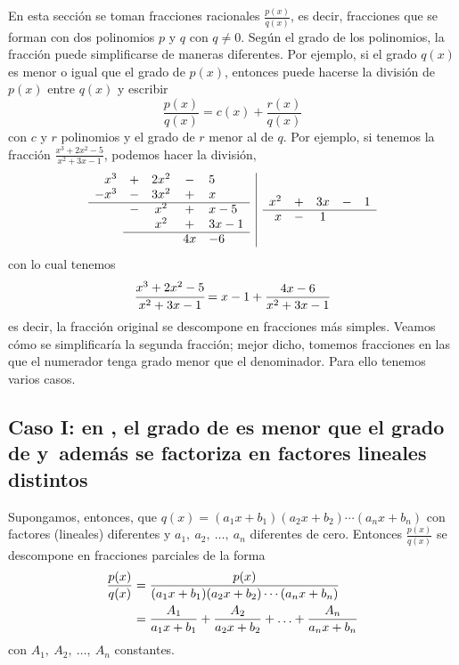 En esta sección se toman fracciones racionales $\frac{p(x)}{q(x)}$, es decir, fracciones que se forman con dos polinomios $p$ y $q$ con $q\ne0$. Según el grado de los polinomios, la fracción puede simplificarse de maneras diferentes. Por ejemplo, si el grado $q(x)$ es menor o igual que el grado de $p(x)$, entonces puede hacerse la división de $p(x)$ entre $q(x)$ y escribir
\[
  \frac{p(x)}{q(x)}=c(x)+\frac{r(x)}{q(x)}
\]
con $c$ y $r$ polinomios y el grado de $r$ menor al de $q$. Por ejemplo, si tenemos la fracción $\frac{x^3+2x^2-5}{x^2+3x-1}$, podemos hacer la división,
\[
  \begin{array}{c|c} %
    \begin{array}{rcccl} %
      x^3 & + & 2x^2 & - & 5 \\
      -x^3 & - & 3x^2 & + & x \\
      \cline{1-5}
      & - & x^2 & + & x-5 \\
      & & x^2 & + & 3x-1 \\
      \cline{2-5}
      & & & 4x & -6 \\
    \end{array}
    &
    \begin{array}{rcccl} %
      x^2 & + & 3x & - & 1 \\
      \cline{1-5}
      x & - & 1 & &
    \end{array}
  \end{array}
\]
con lo cual tenemos
\[
  \cfrac{x^3+2x^2-5}{x^2+3x-1}=x-1+\frac{4x-6}{x^2+3x-1}
\]
es decir, la fracción original se descompone en fracciones más simples. Veamos cómo se simplificaría la segunda fracción; mejor dicho, tomemos fracciones en las que el numerador tenga grado menor que el denominador. Para ello tenemos varios casos.

\subsection{Caso I: en \texorpdfstring{}{p(x)/q(x)}, el grado de \texorpdfstring{}{p} es menor que el grado de \texorpdfstring{}{q} y~además \texorpdfstring{}{q} se factoriza en factores lineales distintos}

Supongamos, entonces, que $q(x)=(a_1x+b_1)(a_2x+b_2)\cdots(a_nx+b_n)$ con factores (lineales) diferentes y $a_1,\ a_2,\ \ldots,\ a_n$ diferentes de cero. Entonces $\frac{p(x)}{q(x)}$ se descompone en fracciones parciales de la forma
\begin{align}\label{FraccLinDif}
  \frac{p(x)}{q(x)}&=\frac{p(x)}{(a_1x+b_1)(a_2x+b_2)\cdots(a_nx+b_n)}\notag\\
  &=\frac{A_1}{a_1x+b_1}+\frac{A_2}{a_2x+b_2}+\ldots+\frac{A_n}{a_nx+b_n}
\end{align}
con $A_1,\ A_2,\ \ldots,\ A_n$ constantes.

